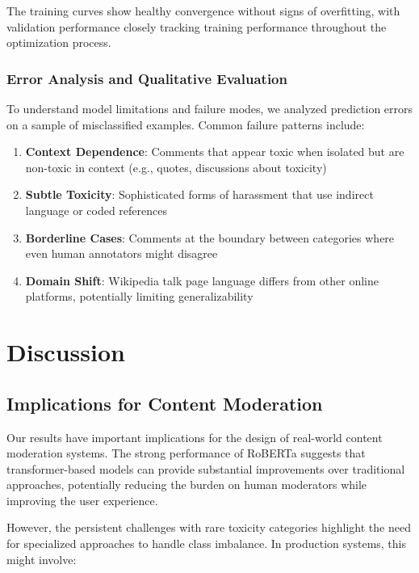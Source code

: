 \documentclass[11pt]{article}
\begin{document}
The training curves show healthy convergence without signs of overfitting, with validation performance closely tracking training performance throughout the optimization process.

\subsubsection{Error Analysis and Qualitative Evaluation}

To understand model limitations and failure modes, we analyzed prediction errors on a sample of misclassified examples. Common failure patterns include:

\begin{enumerate}
    \item \textbf{Context Dependence}: Comments that appear toxic when isolated but are non-toxic in context (e.g., quotes, discussions about toxicity)
    
    \item \textbf{Subtle Toxicity}: Sophisticated forms of harassment that use indirect language or coded references
    
    \item \textbf{Borderline Cases}: Comments at the boundary between categories where even human annotators might disagree
    
    \item \textbf{Domain Shift}: Wikipedia talk page language differs from other online platforms, potentially limiting generalizability
\end{enumerate}

\section{Discussion}

\subsection{Implications for Content Moderation}

Our results have important implications for the design of real-world content moderation systems. The strong performance of RoBERTa suggests that transformer-based models can provide substantial improvements over traditional approaches, potentially reducing the burden on human moderators while improving the user experience.

However, the persistent challenges with rare toxicity categories highlight the need for specialized approaches to handle class imbalance. In production systems, this might involve:
\end{document}
